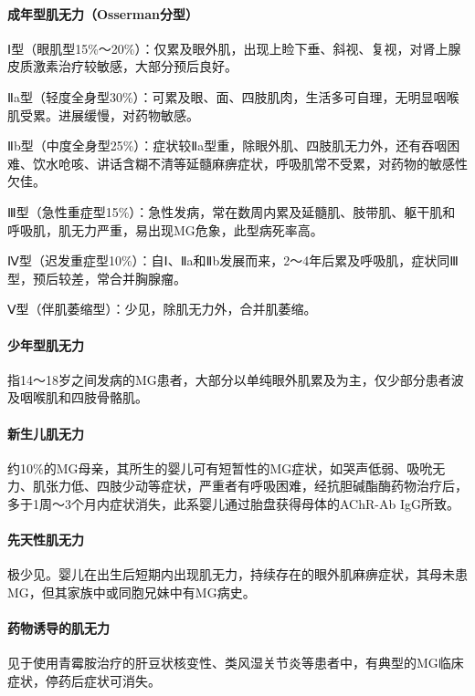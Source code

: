 \paragraph{成年型肌无力（Osserman分型）}

Ⅰ型（眼肌型15\%～20\%）：仅累及眼外肌，出现上睑下垂、斜视、复视，对肾上腺皮质激素治疗较敏感，大部分预后良好。

Ⅱa型（轻度全身型30\%）：可累及眼、面、四肢肌肉，生活多可自理，无明显咽喉肌受累。进展缓慢，对药物敏感。

Ⅱb型（中度全身型25\%）：症状较Ⅱa型重，除眼外肌、四肢肌无力外，还有吞咽困难、饮水呛咳、讲话含糊不清等延髓麻痹症状，呼吸肌常不受累，对药物的敏感性欠佳。

Ⅲ型（急性重症型15\%）：急性发病，常在数周内累及延髓肌、肢带肌、躯干肌和呼吸肌，肌无力严重，易出现MG危象，此型病死率高。

Ⅳ型（迟发重症型10\%）：自Ⅰ、Ⅱa和Ⅱb发展而来，2～4年后累及呼吸肌，症状同Ⅲ型，预后较差，常合并胸腺瘤。

Ⅴ型（伴肌萎缩型）：少见，除肌无力外，合并肌萎缩。

\paragraph{少年型肌无力}

指14～18岁之间发病的MG患者，大部分以单纯眼外肌累及为主，仅少部分患者波及咽喉肌和四肢骨骼肌。

\paragraph{新生儿肌无力}

约10\%的MG母亲，其所生的婴儿可有短暂性的MG症状，如哭声低弱、吸吮无力、肌张力低、四肢少动等症状，严重者有呼吸困难，经抗胆碱酯酶药物治疗后，多于1周～3个月内症状消失，此系婴儿通过胎盘获得母体的AChR-Ab
IgG所致。

\paragraph{先天性肌无力}

极少见。婴儿在出生后短期内出现肌无力，持续存在的眼外肌麻痹症状，其母未患MG，但其家族中或同胞兄妹中有MG病史。

\paragraph{药物诱导的肌无力}

见于使用青霉胺治疗的肝豆状核变性、类风湿关节炎等患者中，有典型的MG临床症状，停药后症状可消失。

